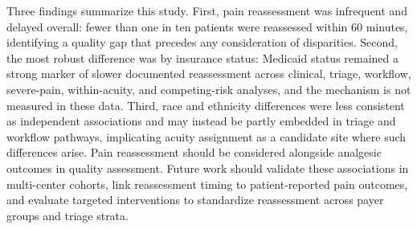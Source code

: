 \documentclass[11pt]{article}
\begin{document}
Three findings summarize this study.
First, pain reassessment was infrequent and delayed overall: fewer than one in ten patients were reassessed within 60 minutes, identifying a quality gap that precedes any consideration of disparities.
Second, the most robust difference was by insurance status: Medicaid status remained a strong marker of slower documented reassessment across clinical, triage, workflow, severe-pain, within-acuity, and competing-risk analyses, and the mechanism is not measured in these data.
Third, race and ethnicity differences were less consistent as independent associations and may instead be partly embedded in triage and workflow pathways, implicating acuity assignment as a candidate site where such differences arise.
Pain reassessment should be considered alongside analgesic outcomes in quality assessment.
Future work should validate these associations in multi-center cohorts, link reassessment timing to patient-reported pain outcomes, and evaluate targeted interventions to standardize reassessment across payer groups and triage strata.
\end{document}
